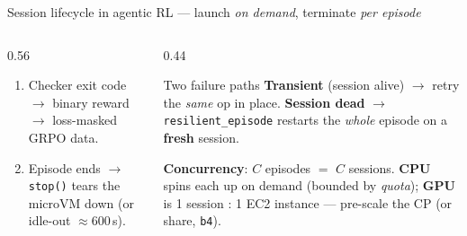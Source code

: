 \documentclass[aspectratio=169]{beamer}
\begin{document}
\begin{frame}{Session lifecycle in agentic RL --- launch \emph{on demand}, terminate \emph{per episode}}
\begin{columns}[T]
\begin{column}{0.56\textwidth}
\begin{enumerate}
        \item[\textbf{4}] Checker exit code $\to$ binary reward $\to$ loss-masked GRPO data.
        \item[\textbf{5}] Episode ends $\to$ \texttt{stop()} tears the microVM down (or idle-out $\approx$600\,s).
      \end{enumerate}
    \end{column}
    \begin{column}{0.44\textwidth}
      \begin{block}{Two failure paths}
        \scriptsize \textbf{Transient} (session alive) $\to$ retry the \emph{same} op in place.
        \textbf{Session dead} $\to$ \texttt{resilient\_episode} restarts the \emph{whole} episode on a
        \textbf{fresh} session.
      \end{block}
      \vspace{0.15em}
      {\scriptsize \textbf{Concurrency}: $C$ episodes $=$ $C$ sessions. \textbf{CPU} spins each up on demand
        (bounded by \emph{quota}); \textbf{GPU} is 1 session : 1 EC2 instance --- pre-scale the CP (or share, \texttt{b4}).}
    \end{column}
  \end{columns}
\end{frame}
\end{document}
